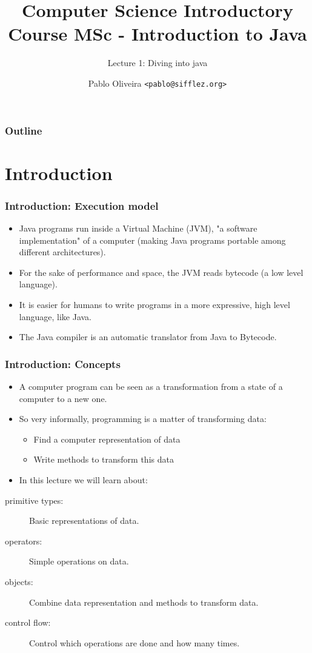 \documentclass[10pt, handout]{beamer}
\title{Computer Science Introductory Course MSc - Introduction to Java}
\subtitle{Lecture 1: Diving into java}
\author[Pablo Oliveira]{Pablo Oliveira \texttt{<pablo@sifflez.org>}}
\institute{T\'el\'ecom ParisTech}
\date{}
\begin{document}
\begin{frame}
  \titlepage
\end{frame}

\begin{frame}
  \frametitle{Outline}
  \tableofcontents
\end{frame}

\section{Introduction}
\begin{frame}[fragile]
  \frametitle{Introduction: Execution model}
  \begin{itemize}
    \item Java programs run inside a Virtual Machine (JVM), "a software implementation" of a computer
          (making Java programs portable among different architectures).
    \item For the sake of performance and space, the JVM reads bytecode (a low level language).
    \item It is easier for humans to write programs in a more expressive, high level language, like Java.
    \item The Java compiler is an automatic translator from Java to Bytecode.
  \end{itemize}
\end{frame}

\begin{frame}[fragile]
  \frametitle{Introduction: Concepts}
  \begin{itemize}
   \item A computer program can be seen as a transformation from a state of a computer to a new one.
   \item So very informally, programming is a matter of transforming data:
    \begin{itemize}
      \item Find a computer representation of data
      \item Write methods to transform this data
    \end{itemize}
   \item In this lecture we will learn about:
  \end{itemize}
   \begin{description}
      \item[primitive types:] Basic representations of data.
      \item[      operators:] Simple operations on data.
      \item[        objects:] Combine data representation and methods to transform data.
      \item[   control flow:] Control which operations are done and how many times.
   \end{description}
\end{frame}
\end{document}
